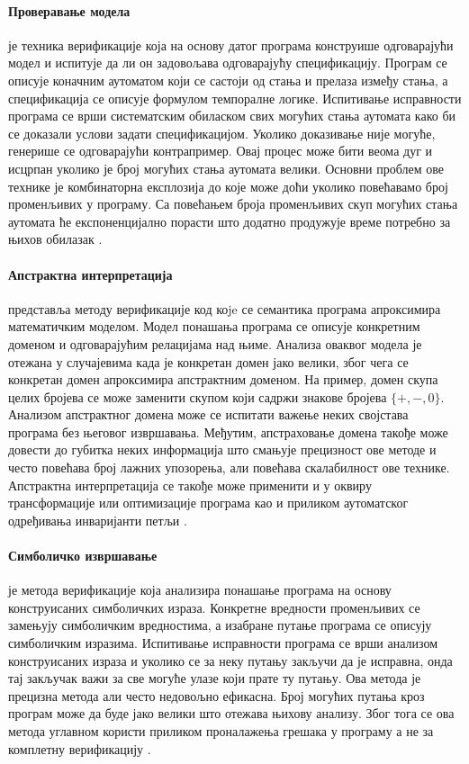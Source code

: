 \documentclass[12pt,oneside]{memoir}
\begin{document}
\paragraph{Проверавање модела} је техника верификације која на основу датог програма конструише одговарајући модел и испитује да ли он задовољава одговарајућу спецификацију. Програм се описује коначним аутоматом који се састоји од стања и прелаза између стања, а спецификација се описује формулом темпоралне логике. Испитивање исправности програма се врши систематским обиласком свих могућих стања аутомата како би се доказали услови задати спецификацијом. Уколико доказивање није могуће, генерише се одговарајући контрапример. Овај процес може бити веома дуг и исцрпан уколико је број могућих стања аутомата велики. Основни проблем ове технике је комбинаторна експлозија до које може доћи уколико повећавамо број променљивих у програму. Са повећањем броја променљивих скуп могућих стања аутомата ће експоненцијално порасти што додатно продужује време потребно за њихов обилазак \cite{mvjphd,verif_tech}.

\paragraph{Апстрактна интерпретација} представља методу верификације код коje се семантика програма апроксимира математичким моделом. Модел понашања програма се описује конкретним доменом и одговарајућим релацијама над њиме. Анализа оваквог модела је отежана у случајевима када је конкретан домен јако велики, због чега се конкретан домен апроксимира апстрактним доменом. На пример, домен скупа целих бројева се може заменити скупом који садржи знакове бројева $ \{+,-,0\}$. Анализом апстрактног домена може се испитати важење неких својстава програма без његовог извршавања. Међутим, апстраховање домена такође може довести до губитка неких информација што смањује прецизност ове методе и често повећава број лажних упозорења, али повећава скалабилност ове технике. Апстрактна интерпретација се такође може применити и у оквиру трансформације или оптимизације програма као и приликом аутоматског одређивања инваријанти петљи \cite{mvjphd,verif_tech}. 

\paragraph{Симболичко извршавање} је метода верификације која анализира понашање програма на основу конструисаних симболичких израза. Конкретне вредности променљивих се замењују симболичким вредностима, а изабране путање програма се описују симболичким изразима. Испитивање исправности програма се врши анализом конструисаних израза и уколико се за неку путању закључи да је исправна, онда тај закључак важи за све могуће улазе који прате ту путању. Ова метода је прецизна метода али често недовољно ефикасна. Број могућих путања кроз програм може да буде јако велики што отежава њихову анализу. Због тога се ова метода углавном користи приликом проналажења грешака у програму а не за комплетну верификацију \cite{mvjphd,symbolic_exec}.
\end{document}
